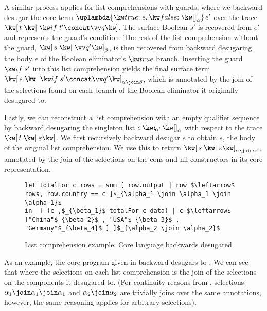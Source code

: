 A similar process applies for list comprehensions with guards, where we backward desugar the core term $\exApp{\exLambda{\elimBool{e}{\annNil{\alpha}}}}{e'}$ over the trace $\exListComp{t}{\qualGuard{t'} \concat \vec{q}}$. The surface Boolean $s'$ is recovered from $e'$ and represents the guard's condition. The rest of the list comprehension without the guard, $\annListComp{s}{\vec{q}'}{\beta}$, is then recovered from backward desugaring the body $e$ of the Boolean eliminator's $\exTrue$ branch. Inserting the guard $\qualGuard{s'}$ into this list comprehension yields the final surface term $\annListComp{s}{\qualGuard{s'} \concat \vec{q}'}{\alpha \join \beta}$, which is annotated by the join of the selections found on each branch of the Boolean eliminator it originally desugared to.

Lastly, we can reconstruct a list comprehension with an empty qualifier sequence by backward desugaring the singleton list $\annCons{e}{\annNil{\alpha}}{\alpha'}$ with respect to the trace $\exListComp{t}{\seqEmpty}$. We first recursively backward desugar $e$ to obtain $s$, the body of the original list comprehension. We use this to return $\annListComp{s}{\seqEmpty}{\alpha \join \alpha'}$, annotated by the join of the selections on the cons and nil constructors in its core representation.

\begin{figure}[H]
\small
\begin{lstlisting}
let totalFor c rows = sum [ row.output | row $\leftarrow$ rows, row.country == c ]$_{\alpha_1 \join \alpha_1 \join \alpha_1}$
in  [ (c ,$_{\beta_1}$ totalFor c data) | c $\leftarrow$ ["China"$_{\beta_2}$ , "USA"$_{\beta_3}$ , "Germany"$_{\beta_4}$ ] ]$_{\alpha_2 \join \alpha_2}$
\end{lstlisting}
\caption{List comprehension example: Core language backwards desugared}
\label{fig:surface-language:example-5}
\end{figure}

\noindent
As an example, the core program given in  backward desugars to . We can see that where the selections on each list comprehension is the join of the selections on the components it desugared to. (For continuity reasons from , selections $\alpha_1 \join \alpha_1 \join \alpha_1$ and $\alpha_2 \join \alpha_2$ are trivially joins over the same annotations, however, the same reasoning applies for arbitrary selections).

